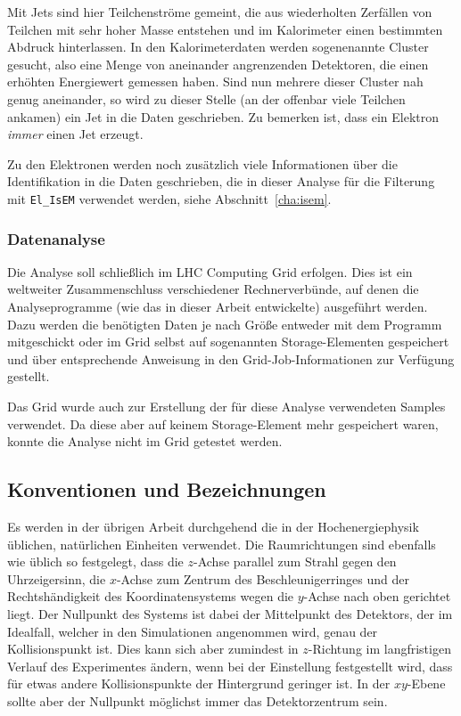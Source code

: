 \label{jet-recon}
Mit Jets sind hier Teilchenströme gemeint, die aus wiederholten Zerfällen von
Teilchen mit sehr hoher Masse entstehen und im Kalorimeter einen bestimmten
Abdruck hinterlassen. In den Kalorimeterdaten werden sogenenannte Cluster
gesucht, also eine Menge von aneinander angrenzenden Detektoren, die einen
erhöhten Energiewert gemessen haben. Sind nun mehrere dieser Cluster nah genug
aneinander, so wird zu dieser Stelle (an der offenbar viele Teilchen ankamen)
ein Jet in die Daten geschrieben. Zu bemerken ist, dass ein Elektron
\emph{immer} einen Jet erzeugt.

Zu den Elektronen werden noch zusätzlich viele Informationen über die
Identifikation in die Daten geschrieben, die in dieser Analyse für die Filterung
mit \lstinline'El_IsEM' verwendet werden, siehe Abschnitt~\ref{cha:isem}.

\subsubsection{Datenanalyse}
Die Analyse soll schließlich im LHC Computing Grid erfolgen. Dies ist ein
weltweiter Zusammenschluss verschiedener Rechnerverbünde, auf denen die
Analyseprogramme (wie das in dieser Arbeit entwickelte) ausgeführt werden. Dazu
werden die benötigten Daten je nach Größe entweder mit dem Programm mitgeschickt
oder im Grid selbst auf sogenannten Storage-Elementen gespeichert und über
entsprechende Anweisung in den Grid-Job-Informationen zur Verfügung gestellt.

Das Grid wurde auch zur Erstellung der für diese Analyse verwendeten Samples
verwendet. Da diese aber auf keinem Storage-Element mehr gespeichert waren,
konnte die Analyse nicht im Grid getestet werden.

\subsection{Konventionen und Bezeichnungen}
\label{cha:conv}
Es werden in der übrigen Arbeit durchgehend die in der Hochenergiephysik
üblichen, natürlichen Einheiten verwendet. Die Raumrichtungen sind ebenfalls wie
üblich so festgelegt, dass die $z$-Achse parallel zum Strahl gegen den
Uhrzeigersinn, die $x$-Achse zum Zentrum des Beschleunigerringes und der
Rechtshändigkeit des Koordinatensystems wegen die $y$-Achse nach oben gerichtet
liegt.  Der Nullpunkt des Systems ist dabei der Mittelpunkt des Detektors, der
im Idealfall, welcher in den Simulationen angenommen wird, genau der
Kollisionspunkt ist.  Dies kann sich aber zumindest in $z$-Richtung im
langfristigen Verlauf des Experimentes ändern, wenn bei der Einstellung
festgestellt wird, dass für etwas andere Kollisionspunkte der Hintergrund
geringer ist. In der $xy$-Ebene sollte aber der Nullpunkt möglichst immer das
Detektorzentrum sein.

